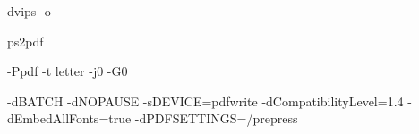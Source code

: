 dvips -o %

ps2pdf %

-Ppdf -t letter -j0 -G0


-dBATCH -dNOPAUSE -sDEVICE=pdfwrite -dCompatibilityLevel=1.4
-dEmbedAllFonts=true -dPDFSETTINGS=/prepress

